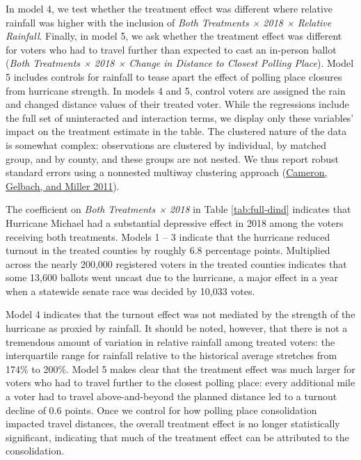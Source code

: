 \documentclass[
  12pt,
]{article}
\begin{document}
In model 4, we test whether the treatment effect was different where relative rainfall was higher with the inclusion of \emph{Both Treatments × 2018 × Relative Rainfall}. Finally, in model 5, we ask whether the treatment effect was different for voters who had to travel further than expected to cast an in-person ballot (\emph{Both Treatments × 2018 × Change in Distance to Closest Polling Place}). Model 5 includes controls for rainfall to tease apart the effect of polling place closures from hurricane strength. In models 4 and 5, control voters are assigned the rain and changed distance values of their treated voter. While the regressions include the full set of uninteracted and interaction terms, we display only these variables' impact on the treatment estimate in the table. The clustered nature of the data is somewhat complex: observations are clustered by individual, by matched group, and by county, and these groups are not nested. We thus report robust standard errors using a nonnested multiway clustering approach (\protect\hyperlink{ref-Cameron2011}{Cameron, Gelbach, and Miller 2011}).

The coefficient on \emph{Both Treatments × 2018} in Table \ref{tab:full-dind} indicates that Hurricane Michael had a substantial depressive effect in 2018 among the voters receiving both treatments. Models 1 -- 3 indicate that the hurricane reduced turnout in the treated counties by roughly 6.8 percentage points. Multiplied across the nearly 200,000 registered voters in the treated counties indicates that some 13,600 ballots went uncast due to the hurricane, a major effect in a year when a statewide senate race was decided by 10,033 votes.

Model 4 indicates that the turnout effect was not mediated by the strength of the hurricane as proxied by rainfall. It should be noted, however, that there is not a tremendous amount of variation in relative rainfall among treated voters: the interquartile range for rainfall relative to the historical average stretches from 174\% to 200\%. Model 5 makes clear that the treatment effect was much larger for voters who had to travel further to the closest polling place: every additional mile a voter had to travel above-and-beyond the planned distance led to a turnout decline of 0.6 points. Once we control for how polling place consolidation impacted travel distances, the overall treatment effect is no longer statistically significant, indicating that much of the treatment effect can be attributed to the consolidation.
\end{document}
